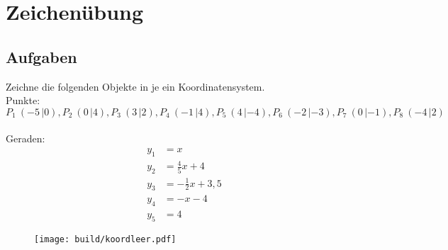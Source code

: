 


    \section*{Zeichenübung}
    \subsection*{Aufgaben}
    Zeichne die folgenden Objekte in je ein Koordinatensystem.\\
    Punkte:\\
    $P_1 \: ( -5 \, |  0),
     P_2 \: (  0 \, |  4),
     P_3 \: (  3 \, |  2),
     P_4 \: ( -1 \, |  4),
     P_5 \: (  4 \, | -4),
     P_6 \: ( -2 \, | -3),
     P_7 \: (  0 \, | -1),
     P_8 \: ( -4 \, |  2)$
    \\~\\
    Geraden:
    \begin{align}
        y_1 &= x\\
        y_2 &= \frac{4}{5}x +4 \\
        y_3 &= -\frac{1}{2}x +3,5 \\
        y_4 &= -x -4 \\
        y_5 &= 4
    \end{align}
    \begin{figure}
        \centering
        \texttt{[image: build/koordleer.pdf]}
    \end{figure}
    
